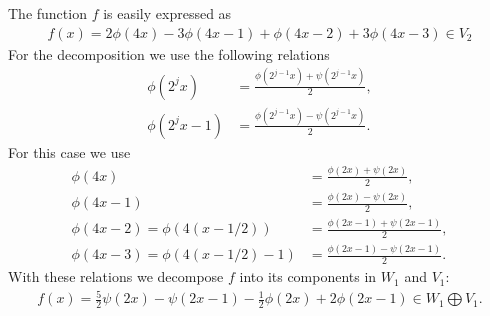 \begin{questions}

\begin{solution}
The function $f$ is easily expressed as
\begin{align*}
f(x)=2\phi(4x)-3\phi(4x-1)+\phi(4x-2)+3\phi(4x-3)\in V_2
\end{align*}
For the decomposition we use the following relations
\begin{align*}
\phi\left(2^jx\right)&=\frac{\phi\left(2^{j-1}x\right)+\psi\left(2^{j-1}x\right)}{2},\\
\phi\left(2^jx-1\right)&=\frac{\phi\left(2^{j-1}x\right)-\psi\left(2^{j-1}x\right)}{2}.
\end{align*}
For this case we use
\begin{align*}
\phi\left(4x\right)&=\frac{\phi\left(2x\right)+\psi\left(2x\right)}{2},\\
\phi\left(4x-1\right)&=\frac{\phi\left(2x\right)-\psi\left(2x\right)}{2},\\
\phi\left(4x-2\right)=\phi\left(4(x-1/2)\right)&=\frac{\phi\left(2x-1\right)+\psi\left(2x-1\right)}{2},\\
\phi\left(4x-3\right)=\phi\left(4(x-1/2)-1\right)&=\frac{\phi\left(2x-1\right)-\psi\left(2x-1\right)}{2}.
\end{align*}
With these relations we decompose $f$ into its components in $W_1$ and $V_1$:
\begin{align*}
f(x)=\frac{5}{2}\psi\left(2x\right)-\psi\left(2x-1\right)-\frac{1}{2}\phi\left(2x\right)+2\phi\left(2x-1\right)\in W_1\bigoplus V_1.

\end{align*}
\end{solution}
\end{questions}
